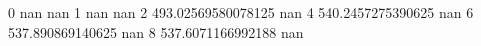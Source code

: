 0 nan nan
1 nan nan
2 493.02569580078125 nan
4 540.2457275390625 nan
6 537.890869140625 nan
8 537.6071166992188 nan
